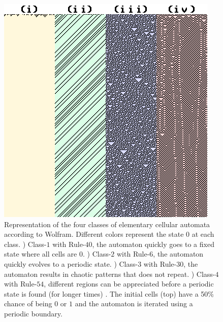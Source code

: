 \begin{figure}
    \centering
    \includegraphics[width=\textwidth]{Images/P4/4classes.png}
    \caption{Representation of the four classes of elementary cellular automata according to Wolfram. Different colors represent the state $0$ at each class. ) Class-$1$ with Rule-$40$, the automaton quickly goes to a fixed state where all cells are $0$. ) Class-$2$ with Rule-$6$, the automaton quickly evolves to a periodic state. ) Class-$3$ with Rule-$30$, the automaton results in chaotic patterns that does not repeat. ) Class-$4$ with Rule-$54$, different regions can be appreciated before a periodic state is found (for longer times) . The initial cells (top) have a 50\% chance of being $0$ or $1$ and the automaton is iterated using a periodic boundary. }
    \label{fig:4classes}
\end{figure}





